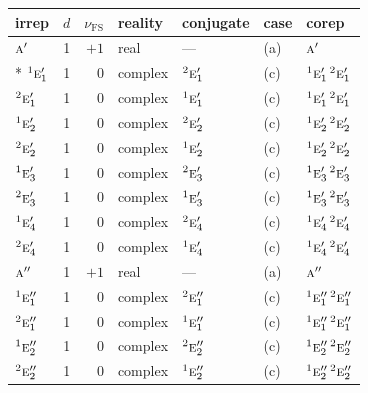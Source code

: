 \documentclass[10pt,a4paper]{article}
\numberwithin{equation}{section}
\newcommand{\irr}[1]{\text{\normalfont\scshape #1}}
\newcommand{\conjpair}[1]{{}^{#1}}
\newcommand{\fsind}{\nu_{\mathrm{FS}}}
\begin{document}
{\small\renewcommand{\arraystretch}{1.25}\setlength{\tabcolsep}{4pt}\begin{longtable}{@{}lrrllll@{}}\toprule
irrep & $d$ & $\fsind$ & reality & conjugate & case & corep\\\midrule\endhead
\bottomrule\endfoot\endlastfoot
$\irr{a}'$ & 1 & $+1$ & real & --- & (a) & $\irr{a}'$\\*
$\conjpair{1}\irr{e}_{1}'$ & 1 & $0$ & complex & $\conjpair{2}\irr{e}_{1}'$ & (c) & $\conjpair{1}\irr{e}_{1}'\,\conjpair{2}\irr{e}_{1}'$\\
$\conjpair{2}\irr{e}_{1}'$ & 1 & $0$ & complex & $\conjpair{1}\irr{e}_{1}'$ & (c) & $\conjpair{1}\irr{e}_{1}'\,\conjpair{2}\irr{e}_{1}'$\\
$\conjpair{1}\irr{e}_{2}'$ & 1 & $0$ & complex & $\conjpair{2}\irr{e}_{2}'$ & (c) & $\conjpair{1}\irr{e}_{2}'\,\conjpair{2}\irr{e}_{2}'$\\
$\conjpair{2}\irr{e}_{2}'$ & 1 & $0$ & complex & $\conjpair{1}\irr{e}_{2}'$ & (c) & $\conjpair{1}\irr{e}_{2}'\,\conjpair{2}\irr{e}_{2}'$\\
$\conjpair{1}\irr{e}_{3}'$ & 1 & $0$ & complex & $\conjpair{2}\irr{e}_{3}'$ & (c) & $\conjpair{1}\irr{e}_{3}'\,\conjpair{2}\irr{e}_{3}'$\\
$\conjpair{2}\irr{e}_{3}'$ & 1 & $0$ & complex & $\conjpair{1}\irr{e}_{3}'$ & (c) & $\conjpair{1}\irr{e}_{3}'\,\conjpair{2}\irr{e}_{3}'$\\
$\conjpair{1}\irr{e}_{4}'$ & 1 & $0$ & complex & $\conjpair{2}\irr{e}_{4}'$ & (c) & $\conjpair{1}\irr{e}_{4}'\,\conjpair{2}\irr{e}_{4}'$\\
$\conjpair{2}\irr{e}_{4}'$ & 1 & $0$ & complex & $\conjpair{1}\irr{e}_{4}'$ & (c) & $\conjpair{1}\irr{e}_{4}'\,\conjpair{2}\irr{e}_{4}'$\\
$\irr{a}''$ & 1 & $+1$ & real & --- & (a) & $\irr{a}''$\\
$\conjpair{1}\irr{e}_{1}''$ & 1 & $0$ & complex & $\conjpair{2}\irr{e}_{1}''$ & (c) & $\conjpair{1}\irr{e}_{1}''\,\conjpair{2}\irr{e}_{1}''$\\
$\conjpair{2}\irr{e}_{1}''$ & 1 & $0$ & complex & $\conjpair{1}\irr{e}_{1}''$ & (c) & $\conjpair{1}\irr{e}_{1}''\,\conjpair{2}\irr{e}_{1}''$\\
$\conjpair{1}\irr{e}_{2}''$ & 1 & $0$ & complex & $\conjpair{2}\irr{e}_{2}''$ & (c) & $\conjpair{1}\irr{e}_{2}''\,\conjpair{2}\irr{e}_{2}''$\\
$\conjpair{2}\irr{e}_{2}''$ & 1 & $0$ & complex & $\conjpair{1}\irr{e}_{2}''$ & (c) & $\conjpair{1}\irr{e}_{2}''\,\conjpair{2}\irr{e}_{2}''$\\

\end{longtable}}
\end{document}
